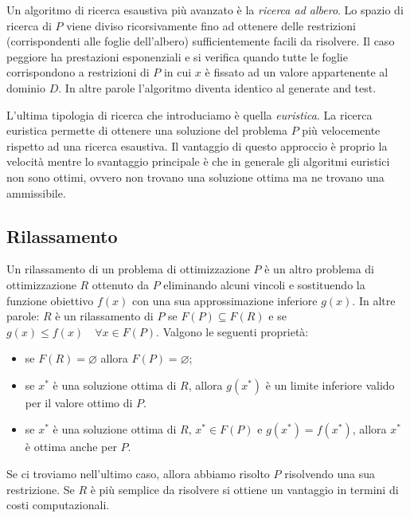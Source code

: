 Un algoritmo di ricerca esaustiva più avanzato è la \textit{ricerca ad albero}.
Lo spazio di ricerca di $P$ viene diviso ricorsivamente fino ad ottenere
delle restrizioni (corrispondenti alle foglie dell'albero) sufficientemente
facili da risolvere.
Il caso peggiore ha prestazioni esponenziali e si verifica quando tutte le 
foglie corrispondono a restrizioni di $P$ in cui $x$ è fissato ad un valore 
appartenente al dominio $D$.
In altre parole l'algoritmo diventa identico al generate and test.

L'ultima tipologia di ricerca che introduciamo è quella \emph{euristica}.
La ricerca euristica permette di ottenere una soluzione del problema $P$
più velocemente rispetto ad una ricerca esaustiva.
Il vantaggio di questo approccio è proprio la velocità mentre lo svantaggio
principale è che in generale gli algoritmi euristici non sono ottimi, ovvero
non trovano una soluzione ottima ma ne trovano una ammissibile.

\subsection{Rilassamento}%
\label{sub:Rilassamento}
Un rilassamento di un problema di ottimizzazione $P$ è un altro problema 
di ottimizzazione $R$ ottenuto da $P$ eliminando alcuni vincoli e sostituendo 
la funzione obiettivo $f(x)$ con una sua approssimazione inferiore $g(x)$.
In altre parole: $R$ è un rilassamento di $P$ se $F(P) \subseteq F(R)$ e se
$g(x) \leq f(x) \quad \forall x \in F(P)$.
Valgono le seguenti proprietà:
\begin{itemize}
    \item se $F(R) = \varnothing$ allora  $F(P) = \varnothing$;
    \item se $x^*$ è una soluzione ottima di $R$, allora $g(x^*)$ è un limite
        inferiore valido per il valore ottimo di $P$.
    \item se $x^*$ è una soluzione ottima di $R$, $x^* \in F(P)$ e $g(x^*) = f(x^*)$,
        allora $x^*$ è ottima anche per $P$.
\end{itemize}
Se ci troviamo nell'ultimo caso, allora abbiamo risolto $P$ risolvendo una
sua restrizione.
Se $R$ è più semplice da risolvere si ottiene un vantaggio in termini di
costi computazionali.



